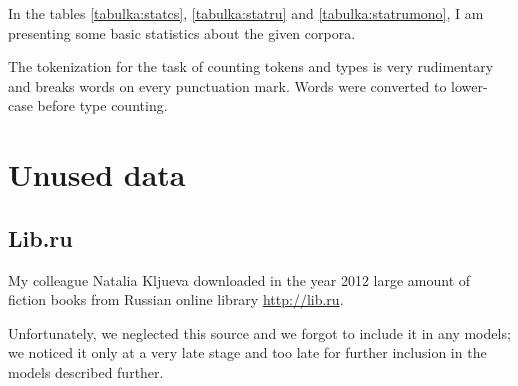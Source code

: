In the tables \ref{tabulka:statcs}, \ref{tabulka:statru} and \ref{tabulka:statrumono}, I am presenting some basic statistics about the given corpora.

The tokenization for the task of counting tokens and types is very rudimentary and breaks words on every punctuation mark. Words were converted to lower-case before type counting.


\section{Unused data}
\subsection{Lib.ru}

My colleague Natalia Kljueva downloaded in the year 2012 large amount of fiction books from Russian online library \url{http://lib.ru}.

Unfortunately, we neglected this source and we forgot to include it in any models; we noticed it only at a very late stage and too late for further inclusion in the models described further.
